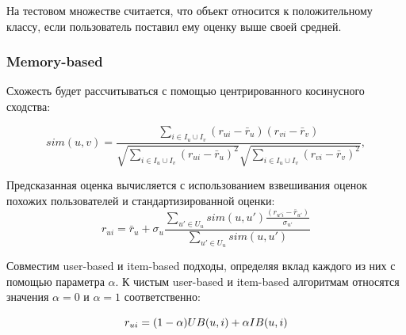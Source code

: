 На тестовом множестве считается, что объект относится к положительному классу, если пользователь поставил ему оценку выше своей средней.

\subsubsection{Memory-based}
Схожесть будет рассчитываться с помощью центрированного косинусного сходства:

\begin{equation}
    sim(u, v) = \frac
    {\sum_{i \in I_u \cup I_v}{(r_{ui} - \bar r_u)(r_{vi} - \bar r_v)}}
    {\sqrt{\sum_{i \in I_u \cup I_v}{(r_{ui} - \bar r_u)^2}} 
    \sqrt{\sum_{i \in I_u \cup I_v}{(r_{vi} - \bar r_v)^2}}},\label{eq:equation2}
\end{equation}

Предсказанная оценка вычисляется с использованием взвешивания оценок похожих пользователей и стандартизированной оценки:
\begin{equation}
    r_{ui} = \bar r_u + \sigma_u \frac
    {\sum_{u' \in U_u}{sim(u, u')\frac{(r_{u'i} - \bar r_{u'})}{\sigma_{u'}}}}
    {\sum_{u' \in U_u}{sim(u, u')}}\label{eq:equation3}
\end{equation}

Совместим user-based и item-based подходы, определяя вклад каждого из них с помощью параметра $\alpha$.
К чистым user-based и item-based алгоритмам относятся значения $\alpha = 0$ и $\alpha = 1$ соответственно:

\begin{equation}\label{eq:memory_hybrid}
r_{ui} = (1 - \alpha)\space UB(u, i) + \alpha\space IB(u,i)
\end{equation}

